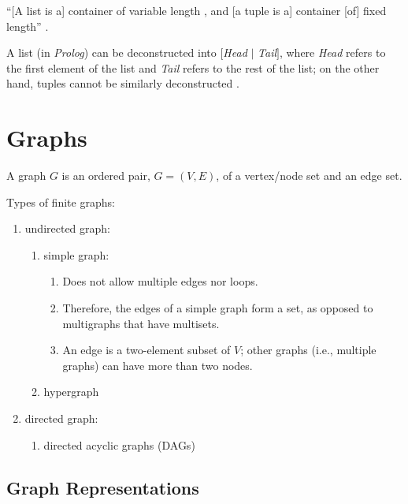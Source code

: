 ``[A list is a] container of variable length , and [a tuple is a] container [of] fixed length'' \cite[\S4.3 pp. 111]{Tate2010}.

A list (in {\it Prolog}) can be deconstructed into $[${\it Head} $|$ {\it Tail}$]$, where {\it Head} refers to the first element of the list and {\it Tail} refers to the rest of the list; on the other hand, tuples cannot be similarly deconstructed \cite[\S4.3 pp. 113]{Tate2010}.





\section{Graphs}
\label{sec:Graphs}

A graph $G$ is an ordered pair, $G = (V,E)$, of a vertex/node set and an edge set.

Types of finite graphs: \vspace{-0.3cm}
\begin{enumerate} \itemsep -4pt
\item undirected graph: \vspace{-0.3cm}
	\begin{enumerate} \itemsep -2pt
	\item simple graph: \vspace{-0.2cm}
		\begin{enumerate} \itemsep -2pt
		\item Does not allow multiple edges nor loops.
		\item Therefore, the edges of a simple graph form a set, as opposed to multigraphs that have multisets.
		\item An edge is a two-element subset of $V$; other graphs (i.e., multiple graphs) can have more than two nodes.
		\end{enumerate}
	\item hypergraph
	\end{enumerate}
\item directed graph: \vspace{-0.3cm}
	\begin{enumerate} \itemsep -2pt
	\item directed acyclic graphs (DAGs)
	\end{enumerate}
\end{enumerate}


\subsection{Graph Representations}
\label{ssec:GraphRepresentations}

